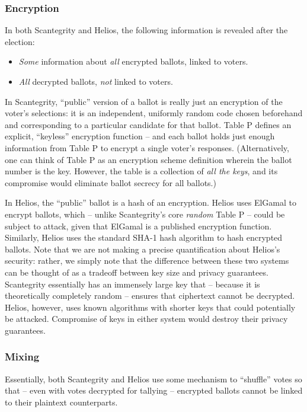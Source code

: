 \documentclass[10pt]{article}
\begin{document}
\begin{multicols}{2}
\subsubsection{Encryption}

In both Scantegrity and Helios, the following information is revealed after the election:
\begin{itemize}
	\item
		\emph{Some} information about \emph{all} encrypted ballots, linked to voters.
	\item
		\emph{All} decrypted ballots, \emph{not} linked to voters.
\end{itemize}

In Scantegrity, ``public'' version of a ballot is really just an encryption of the voter's
selections: it is an independent, uniformly random code chosen beforehand and corresponding to a
particular candidate for that ballot. Table P defines an explicit, ``keyless'' encryption
function -- and each ballot holds just enough information from Table P to encrypt a single voter's
responses. (Alternatively, one can think of Table P as an encryption scheme definition wherein the
ballot number is the key. However, the table is a collection of \emph{all the keys}, and its
compromise would eliminate ballot secrecy for all ballots.)

In Helios, the ``public'' ballot is a hash of an encryption. Helios uses ElGamal to encrypt ballots,
which -- unlike Scantegrity's core \emph{random} Table P -- could be subject to attack, given that
ElGamal is a published encryption function. Similarly, Helios uses the standard SHA-1 hash algorithm
to hash encrypted ballots. Note that we are not making a precise quantification about Helios's
security: rather, we simply note that the difference between these two systems can be thought of as
a tradeoff between key size and privacy guarantees. Scantegrity essentially has an immensely large
key that -- because it is theoretically completely random -- ensures that ciphertext cannot be
decrypted. Helios, however, uses known algorithms with shorter keys that could potentially be
attacked. Compromise of keys in either system would destroy their privacy guarantees.

\subsubsection{Mixing}

Essentially, both Scantegrity and Helios use some mechanism to ``shuffle'' votes so that -- even
with votes decrypted for tallying -- encrypted ballots cannot be linked to their plaintext
counterparts.


\end{multicols}
\end{document}
